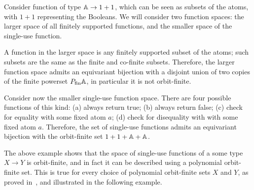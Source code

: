 \begin{example}\label{ex:first-single-use-function-space}
    Consider function of type $\mathbb A \to 1 + 1$, which can be seen as subsets of the atoms, with $1+1$ representing the Booleans. We will consider two function spaces: the larger space of all finitely supported functions, and the smaller space of the single-use function.
    
    A function in the larger space is any finitely supported subset of the atoms; such subsets are the same as the finite and co-finite subsets. Therefore, the larger function space admits an equivariant bijection with a disjoint union of two copies of the finite powerset $\powerset_{\text{fin}} \atoms$, in particular it is not orbit-finite.
    
    Consider now the smaller single-use function space. There are four possible functions of this kind: (a) always return true; (b) always return false; (c) check for equality with some fixed atom $a$; (d) check for disequality with with some fixed atom $a$.  Therefore,  the set of single-use functions  admits an equivariant bijection with the orbit-finite set $1 + 1 + \mathbb A + \mathbb A$.
    \exampleend
\end{example}


The above example shows that the space of single-use functions of a some type $X \to Y$ is orbit-finite, and in fact it can be described using a polynomial orbit-finite set. This is true for every choice of polynomial orbit-finite sets $X$ and $Y$, as proved in~\cite[Theorem 5]{stefanski-phd}, and illustrated in the following example. 


